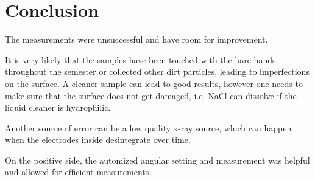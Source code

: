 \section{Conclusion}
\label{sec:conclusion}
The measurements were unsuccessful and have room for improvement.

It is very likely that the samples have been touched with the bare hands throughout the semester or
collected other dirt particles,
leading to imperfections on the surface. A cleaner sample can lead to good results, however one
needs to make sure that the surface does not get damaged, i.e. NaCl can dissolve if the liquid cleaner is
hydrophilic.

Another source of error can be a low quality x-ray source, which can happen when the electrodes
inside desintegrate over time.

On the positive side, the automized angular setting and measurement was helpful and allowed for
efficient measurements.

